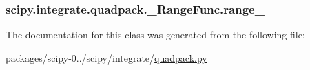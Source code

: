 \subsubsection[{range\+\_\+}]{\setlength{\rightskip}{0pt plus 5cm}scipy.\+integrate.\+quadpack.\+\_\+\+Range\+Func.\+range\+\_\+}\label{classscipy_1_1integrate_1_1quadpack_1_1__RangeFunc_a975c32a47889c61cdce4d477d2118908}


The documentation for this class was generated from the following file\+:\begin{DoxyCompactItemize}
\item 
packages/scipy-\/0../scipy/integrate/\hyperlink{quadpack_8py}{quadpack.\+py}\end{DoxyCompactItemize}
